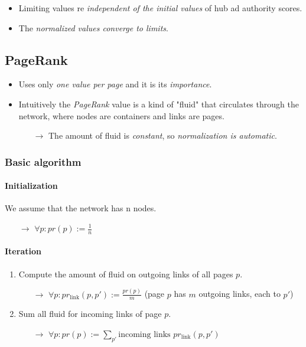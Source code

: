 \begin{itemize}
\item Limiting values re \textit{independent of the initial values} of hub ad authority scores.
\item The \textit{normalized values converge to limits}.
\end{itemize}

\subsection{PageRank}

\begin{itemize}
\item Uses only \textit{one value per page} and it is its \textit{importance}.
\item Intuitively the \textit{PageRank} value is a kind of "fluid" that circulates through the network, where nodes are containers and links are pages.
	\begin{itemize}
	\item[$\rightarrow$] The amount of fluid is \textit{constant}, so \textit{normalization is automatic}.
	\end{itemize}
\end{itemize}

\subsubsection{Basic algorithm}

\paragraph{Initialization}

We assume that the network has n nodes.
\begin{itemize}
\item[$\rightarrow$] $\forall p : pr(p) := \frac{1}{n}$
\end{itemize}

\paragraph{Iteration}

\begin{enumerate}
\item Compute the amount of fluid on outgoing links of all pages $p$.
	\begin{itemize}
	\item[$\rightarrow$] $\forall p : pr_{\text{link}}(p, p') := \frac{pr(p)}{m}$ (page $p$ has $m$ outgoing links, each to $p'$)
	\end{itemize}
\item Sum all fluid for incoming links of page $p$.
	\begin{itemize}
	\item[$\rightarrow$] $\forall p : pr(p) := \sum_{p'} \text{incoming links } pr_{\text{link}}(p, p')$
	\end{itemize}
\end{enumerate}

